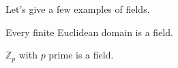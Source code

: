   Let's give a few examples of fields. 

  \begin{theorem}
    Every finite Euclidean domain is a field. 
  \end{theorem} 

  \begin{example}
    $\mathbb{Z}_p$ with $p$ prime is a field. 
  \end{example}



